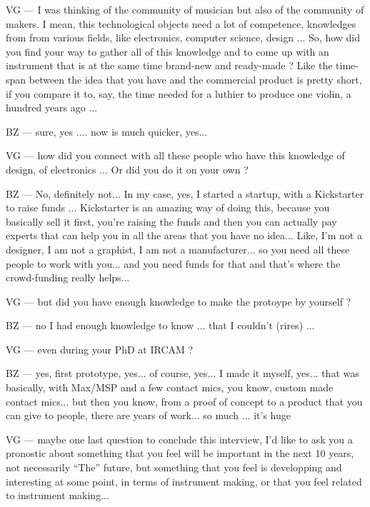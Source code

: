 VG — I was thinking of the community of musician but also of the community of makers. I mean, this technological objects need a lot of competence, knowledges from from various fields, like electronics, computer science, design ... So, how did you find your way to gather all of this knowledge and to come up with an instrument that is at the same time brand-new and ready-made ? Like the time-span between the idea that you have and the commercial product is pretty short, if you compare it to, say, the time needed for a luthier to produce one violin, a hundred years ago ...

BZ — sure, yes .... now is much quicker, yes...

VG — how did you connect with all these people who have this knowledge of design, of electronics ... Or did you do it on your own ? 

BZ — No, definitely not... In my case, yes, I started a startup, with a Kickstarter to raise funds ... Kickstarter is an amazing way of doing this, because you basically sell it first, you're raising the funds and then you can actually pay experts that can help you in all the areas that you have no idea... Like, I'm not a designer, I am not a graphist, I am not a manufacturer... so you need all these people to work with you... and you need funds for that and that's where the crowd-funding really helps... 

VG — but did you have enough knowledge to make the protoype by yourself ?

BZ — no I had enough knowledge to know ... that I couldn't (rires) ... 

VG — even during your PhD at IRCAM ?

BZ — yes, first prototype, yes... of course, yes... I made it myself, yes... that was basically, with Max/MSP and a few contact mics, you know, custom made contact mics... but then you know, from a proof of concept to a product that you can give to people, there are years of work... so much ... it's huge

VG — maybe one last question to conclude this interview, I'd like to ask you a pronostic about something that you feel will be important in the next 10 years, not necessarily ``The'' future, but something that you feel is developping and interesting at some point, in terms of instrument making, or that you feel related to instrument making...

